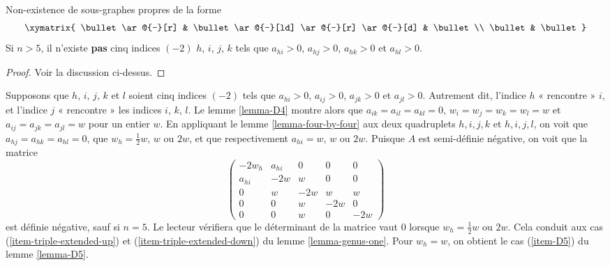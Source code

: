 \begin{lemma}
\label{lemma-fourfold}
Non-existence de sous-graphes propres de la forme
$$
\xymatrix{
\bullet \ar@{-}[r] & \bullet \ar@{-}[ld] \ar@{-}[r] \ar@{-}[d] & \bullet \\
\bullet & \bullet
}
$$
Si $n > 5$, il n'existe {\bf pas} cinq indices $(-2)$
$h$, $i$, $j$, $k$ tels que $a_{hi} > 0$, $a_{hj} > 0$, $a_{hk} > 0$ et
$a_{hl} > 0$.
\end{lemma}

\begin{proof}
Voir la discussion ci-dessus.
\end{proof}

\noindent
Supposons que $h$, $i$, $j$, $k$ et $l$ soient cinq indices $(-2)$
tels que $a_{hi} > 0$, $a_{ij} > 0$, $a_{jk} > 0$ et $a_{jl} > 0$.
Autrement dit, l'indice $h$ « rencontre » $i$, et l'indice $j$ « rencontre »
les indices $i$, $k$, $l$. Le
lemme \ref{lemma-D4} montre alors que $a_{ik} = a_{il} = a_{kl} = 0$,
$w_i = w_j = w_k = w_l = w$ et $a_{ij} = a_{jk} = a_{jl} = w$
pour un entier $w$. En appliquant le lemme \ref{lemma-four-by-four} aux
deux quadruplets
$h, i, j, k$ et $h, i, j, l$, on voit que $a_{hj} = a_{hk} = a_{hl} = 0$,
que $w_h = \frac{1}{2}w$, $w$ ou $2w$, et que
respectivement $a_{hi} = w$, $w$ ou $2w$.
Puisque $A$ est semi-définie négative, on voit que la matrice
$$
\left(
\begin{matrix}
-2w_h & a_{hi} & 0 & 0 & 0 \\
a_{hi} & -2w & w & 0 & 0 \\
0 & w & -2w & w & w \\
0 & 0 & w & -2w & 0 \\
0 & 0 & w & 0 & -2w
\end{matrix}
\right)
$$
est définie négative, sauf si $n = 5$. Le lecteur vérifiera que le
déterminant de la matrice vaut $0$ lorsque $w_h = \frac{1}{2}w$ ou $2w$.
Cela conduit aux cas (\ref{item-triple-extended-up}) et
(\ref{item-triple-extended-down}) du lemme \ref{lemma-genus-one}.
Pour $w_h = w$, on obtient le cas (\ref{item-D5}) du
lemme \ref{lemma-D5}.

